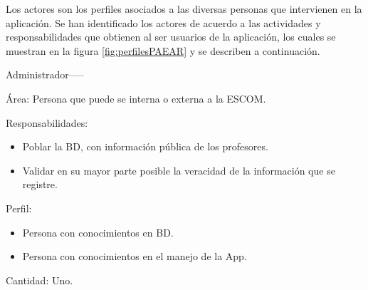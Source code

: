 Los actores son los perfiles asociados a las diversas personas que intervienen en la aplicación. Se han identificado los actores de acuerdo a las actividades y responsabilidades que obtienen al ser usuarios de la aplicación, los cuales se muestran en la figura \ref{fig:perfilesPAEAR} y se describen a continuación.


    \begin{actor}{Administrador}{-----}

	\item[Área:] Persona que puede se interna o externa a la ESCOM.

	\item[Responsabilidades:] \hspace{1pt}
	
		\begin{itemize}
		    \item Poblar la BD, con información pública de los profesores.
		    \item Validar en su mayor parte posible la veracidad de la información que se registre.
		 \end{itemize}
	\item[Perfil:] \hspace{1pt}
		\begin{itemize}
		    \item Persona con conocimientos en BD.
		    \item Persona con conocimientos en el manejo de la App.
	    \end{itemize}
	\item[Cantidad:] Uno.
\end{actor}


